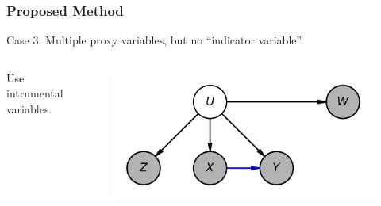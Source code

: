 \documentclass{beamer}
\begin{document}
\begin{frame}
\frametitle{Proposed Method}

Case 3: Multiple proxy variables, but no ``indicator variable''.
\begin{columns}
	Use intrumental variables.


    \begin{figure}
    	\centering
    	\includegraphics[scale=0.5]{scripts/double_proxy.png}
    \end{figure}

\end{columns}

\end{frame}
\end{document}
